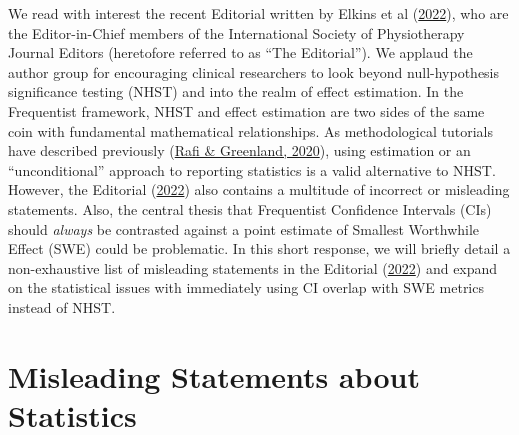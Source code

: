 \documentclass[]{cik}%
\begin{document}

\maketitle

\newpage

\newpage

We read with interest the recent Editorial written by Elkins et al
(\protect\hyperlink{ref-elkins2022}{2022}), who are the Editor-in-Chief
members of the International Society of Physiotherapy Journal Editors
(heretofore referred to as ``The Editorial''). We applaud the author
group for encouraging clinical researchers to look beyond
null-hypothesis significance testing (NHST) and into the realm of effect
estimation. In the Frequentist framework, NHST and effect estimation are
two sides of the same coin with fundamental mathematical relationships.
As methodological tutorials have described previously
(\protect\hyperlink{ref-rafi2020}{Rafi \& Greenland, 2020}), using
estimation or an ``unconditional'' approach to reporting statistics is a
valid alternative to NHST. However, the Editorial
(\protect\hyperlink{ref-elkins2022}{2022}) also contains a multitude of
incorrect or misleading statements. Also, the central thesis that
Frequentist Confidence Intervals (CIs) should \emph{always} be
contrasted against a point estimate of Smallest Worthwhile Effect (SWE)
could be problematic. In this short response, we will briefly detail a
non-exhaustive list of misleading statements in the Editorial
(\protect\hyperlink{ref-elkins2022}{2022}) and expand on the statistical
issues with immediately using CI overlap with SWE metrics instead of
NHST.

\hypertarget{misleading-statements-about-statistics}{%
\section{Misleading Statements about
Statistics}\label{misleading-statements-about-statistics}}
\end{document}
